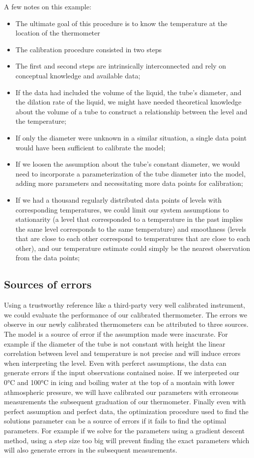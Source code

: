 \begin{bibunit}
A few notes on this example:
\begin{itemize}
\item The ultimate goal of this procedure is to know the temperature at the location of the thermometer
\item The calibration procedure consisted in two steps
\item The first and second steps are intrinsically interconnected and rely on conceptual knowledge and available data;
\item If the data had included the volume of the liquid, the tube's diameter, and the dilation rate of the liquid, we might have needed theoretical knowledge about the volume of a tube to construct a relationship between the level and the temperature;
\item If only the diameter were unknown in a similar situation, a single data point would have been sufficient to calibrate the model;
\item If we loosen the assumption about the tube's constant diameter, we would need to incorporate a parameterization of the tube diameter into the model, adding more parameters and necessitating more data points for calibration;
\item If we had a thousand regularly distributed data points of levels with corresponding temperatures, we could limit our system assumptions to stationarity (a level that corresponded to a temperature in the past implies the same level corresponds to the same temperature) and smoothness (levels that are close to each other correspond to temperatures that are close to each other), and our temperature estimate could simply be the nearest observation from the data points;
  \end{itemize}

\subsection{Sources of errors}
 Using a trustworthy reference like a third-party very well calibrated instrument, we could evaluate the performance of our calibrated thermometer.
 The errors we observe in our newly calibrated thermometers can be attributed to three sources.
 The model is a source of error if the assumption made were inacurate. For example if the diameter of the tube is not constant with height the linear correlation between level and temperature is not precise and will induce errors when interpreting the level.
 Even with perferct assumptions, the data can generate errors if the input observations contained noise. If we interpreted our 0°C and 100°C in icing and boiling water at the top of a montain with lower athmospheric pressure, we will have calibrated our parameters with erroneous measurements the subsequent graduation of our thermometer.
 Finally even with perfect assumption and perfect data, the optimization procedure used to find the solutions parameter can be a source of errors if it fails to find the optimal parameters. For example if we solve for the parameters using a gradient descent method, using a step size too big will prevent finding the exact parameters which will also generate errors in the subsequent measurements.



\end{bibunit}
